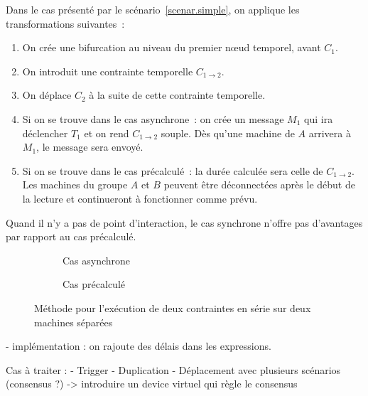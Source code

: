 \documentclass{article}
\newcommand\timenode{nœud temporel\xspace}
\begin{document}
Dans le cas présenté par le scénario~\ref{scenar.simple}, on applique les transformations suivantes~: 
\begin{enumerate}
    \item On crée une bifurcation au niveau du premier \timenode, avant $C_1$.
    \item On introduit une contrainte temporelle $C_{1\rightarrow2}$.
    \item On déplace $C_2$ à la suite de cette contrainte temporelle.
    \item Si on se trouve dans le cas asynchrone~: on crée un message $M_1$ qui ira déclencher $T_1$ et on rend $C_{1\rightarrow2}$ souple.
    Dès qu'une machine de $A$ arrivera à $M_1$, le message sera envoyé.
    \item Si on se trouve dans le cas précalculé~: la durée calculée sera celle de $C_{1\rightarrow2}$. Les machines du groupe $A$ et $B$ peuvent être déconnectées après le début de la lecture et continueront à fonctionner comme prévu.
\end{enumerate}
Quand il n'y a pas de point d'interaction, le cas synchrone n'offre pas d'avantages par rapport au cas précalculé.

\begin{figure}[h]
\centering
\begin{subfigure}{.5\linewidth}
\begin{tikzpicture}

\end{tikzpicture}
\caption{Cas asynchrone}
\end{subfigure}

\begin{subfigure}{.5\linewidth}
    \begin{tikzpicture}
    
    \end{tikzpicture}
    \caption{Cas précalculé}
\end{subfigure}
\caption{Méthode pour l'exécution de deux contraintes en série sur deux machines séparées}
\label{scenar.deplacement}
\end{figure}

- implémentation : on rajoute des délais dans les expressions.


Cas à traiter : 
- Trigger
- Duplication
- Déplacement avec plusieurs scénarios (consensus ?) -> introduire un device virtuel qui règle le consensus
\end{document}
